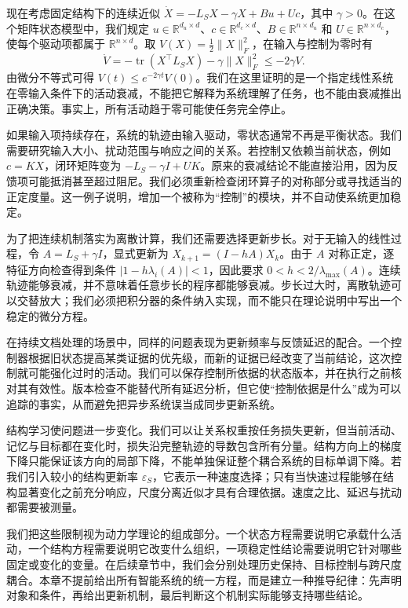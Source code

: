现在考虑固定结构下的连续近似 $\dot X=-L_SX-\gamma X+Bu+Uc$，其中 $\gamma>0$。在这个矩阵状态模型中，我们规定 $u\in\mathbb{R}^{d_u\times d}$、$c\in\mathbb{R}^{d_c\times d}$、$B\in\mathbb{R}^{n\times d_u}$ 和 $U\in\mathbb{R}^{n\times d_c}$，使每个驱动项都属于 $\mathbb{R}^{n\times d}$。取 $V(X)=\tfrac12\|X\|_F^2$，在输入与控制为零时有
\begin{equation}
 \dot V=-\operatorname{tr}(X^\top L_SX)-\gamma\|X\|_F^2
 \leq-2\gamma V.
\end{equation}
由微分不等式可得 $V(t)\leq e^{-2\gamma t}V(0)$。我们在这里证明的是一个指定线性系统在零输入条件下的活动衰减，不能把它解释为系统理解了任务，也不能由衰减推出正确决策。事实上，所有活动趋于零可能使任务完全停止。

如果输入项持续存在，系统的轨迹由输入驱动，零状态通常不再是平衡状态。我们需要研究输入大小、扰动范围与响应之间的关系。若控制又依赖当前状态，例如 $c=KX$，闭环矩阵变为 $-L_S-\gamma I+UK$。原来的衰减结论不能直接沿用，因为反馈项可能抵消甚至超过阻尼。我们必须重新检查闭环算子的对称部分或寻找适当的正定度量。这一例子说明，增加一个被称为“控制”的模块，并不自动使系统更加稳定。

为了把连续机制落实为离散计算，我们还需要选择更新步长。对于无输入的线性过程，令 $A=L_S+\gamma I$，显式更新为 $X_{k+1}=(I-hA)X_k$。由于 $A$ 对称正定，逐特征方向检查得到条件 $|1-h\lambda_i(A)|<1$，因此要求 $0<h<2/\lambda_{\max}(A)$。连续轨迹能够衰减，并不意味着任意步长的程序都能够衰减。步长过大时，离散轨迹可以交替放大；我们必须把积分器的条件纳入实现，而不能只在理论说明中写出一个稳定的微分方程。

在持续文档处理的场景中，同样的问题表现为更新频率与反馈延迟的配合。一个控制器根据旧状态提高某类证据的优先级，而新的证据已经改变了当前结论，这次控制就可能强化过时的活动。我们可以保存控制所依据的状态版本，并在执行之前核对其有效性。版本检查不能替代所有延迟分析，但它使“控制依据是什么”成为可以追踪的事实，从而避免把异步系统误当成同步更新系统。

结构学习使问题进一步变化。我们可以让关系权重按任务损失更新，但当前活动、记忆与目标都在变化时，损失沿完整轨迹的导数包含所有分量。结构方向上的梯度下降只能保证该方向的局部下降，不能单独保证整个耦合系统的目标单调下降。若我们引入较小的结构更新率 $\varepsilon_S$，它表示一种速度选择；只有当快速过程能够在结构显著变化之前充分响应，尺度分离近似才具有合理依据。速度之比、延迟与扰动都需要被测量。

我们把这些限制视为动力学理论的组成部分。一个状态方程需要说明它承载什么活动，一个结构方程需要说明它改变什么组织，一项稳定性结论需要说明它针对哪些固定或变化的变量。在后续章节中，我们会分别处理历史保持、目标控制与跨尺度耦合。本章不提前给出所有智能系统的统一方程，而是建立一种推导纪律：先声明对象和条件，再给出更新机制，最后判断这个机制实际能够支持哪些结论。

